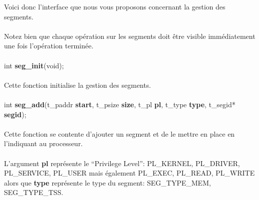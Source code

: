 \documentclass[10pt,a4wide]{article}
\begin{document}
Voici donc l'interface que nous vous proposons concernant la
gestion des segments.

\paragraph{}

Notez bien que chaque op\'eration sur les segments doit \^etre
visible imm\'ediatement une fois l'op\'eration termin\'ee.

\paragraph{}

\hspace{1.5cm}int \textbf{seg\_init}(void);

\paragraph{}

Cette fonction initialise la gestion des segments.

\paragraph{}

\hspace{1.5cm}int \textbf{seg\_add}(t\_paddr \textbf{start},
                                    t\_psize \textbf{size},
                                    t\_pl \textbf{pl},
                                    t\_type \textbf{type},
                                    t\_segid* \textbf{segid});

\paragraph{}

Cette fonction se contente d'ajouter un segment et de le mettre en
place en l'indiquant au processeur.

\paragraph{}

L'argument \textbf{pl} repr\'esente le ``Privilege Level'': PL\_KERNEL,
PL\_DRIVER, PL\_SERVICE, PL\_USER mais \'egalement PL\_EXEC, PL\_READ,
PL\_WRITE alors que \textbf{type} repr\'esente le type du segment:
SEG\_TYPE\_MEM, SEG\_TYPE\_TSS.

\paragraph{}
\end{document}
